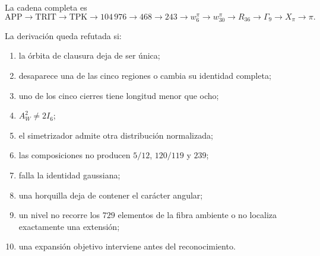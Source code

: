 La cadena completa es
\[
 \mathrm{APP}\to\mathrm{TRIT}\to\mathrm{TPK}
 \to104\,976\to468\to243\to w_6^\pi
 \to w_{30}^\pi\to R_{36}\to\Gamma_9
 \to X_\pi\to\pi.
\]

\begin{remark}
La derivación queda refutada si:
\begin{enumerate}
 \item la órbita de clausura deja de ser única;
 \item desaparece una de las cinco regiones o cambia su identidad completa;
 \item uno de los cinco cierres tiene longitud menor que ocho;
 \item \(A_W^2\ne2I_6\);
 \item el simetrizador admite otra distribución normalizada;
 \item las composiciones no producen \(5/12\), \(120/119\) y \(239\);
 \item falla la identidad gaussiana;
 \item una horquilla deja de contener el carácter angular;
 \item un nivel no recorre los \(729\) elementos de la fibra ambiente o no
       localiza exactamente una extensión;
 \item una expansión objetivo interviene antes del reconocimiento.
\end{enumerate}
\end{remark}
